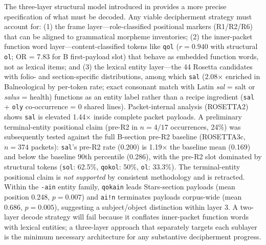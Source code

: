 \documentclass[11pt,a4paper,twocolumn]{article}
\begin{document}
The three-layer structural model introduced in  provides a more precise specification of what must be decoded. %
Any viable decipherment strategy must account for: (1) the frame layer---role-classified positional markers (R1/R2/R6) that can be aligned to grammatical morpheme inventories; (2) the inner-packet function word layer---content-classified tokens like \texttt{qol} ($r = 0.940$ with structural \texttt{ol}; OR = 7.83 for B first-payload slot) that behave as embedded function words, not as lexical items; and (3) the lexical entity layer---the 44 Rosetta candidates with folio- and section-specific distributions, among which \texttt{sal} (2.08$\times$ enriched in Balneological by per-token rate; exact consonant match with Latin \textit{sal} = salt or \textit{salus} = health) functions as an entity label rather than a recipe ingredient (\texttt{sal} + \texttt{oly} co-occurrence = 0 shared lines). Packet-internal analysis (ROSETTA2) shows \texttt{sal} is elevated 1.44$\times$ inside complete packet payloads. A preliminary terminal-entity positional claim (pre-R2 in $n = 4/17$ occurrences, 24\%) was subsequently tested against the full B-section pre-R2 baseline (ROSETTA3c, $n = 374$ packets): \texttt{sal}'s pre-R2 rate (0.200) is 1.19$\times$ the baseline mean (0.169) and below the baseline 90th percentile (0.286), with the pre-R2 slot dominated by structural tokens (\texttt{sol}: 62.5\%, \texttt{qokol}: 50\%, \texttt{ol}: 33.3\%). The terminal-entity positional claim is \emph{not supported} by consistent methodology and is retracted. Within the \texttt{-ain} entity family, \texttt{qokain} leads Stars-section payloads (mean position 0.248, $p = 0.007$) and \texttt{ai!n} terminates payloads corpus-wide (mean 0.686, $p = 0.005$), suggesting a subject/object distinction within layer 3. A two-layer decode strategy will fail because it conflates inner-packet function words with lexical entities; a three-layer approach that separately targets each sublayer is the minimum necessary architecture for any substantive decipherment progress.
\end{document}
